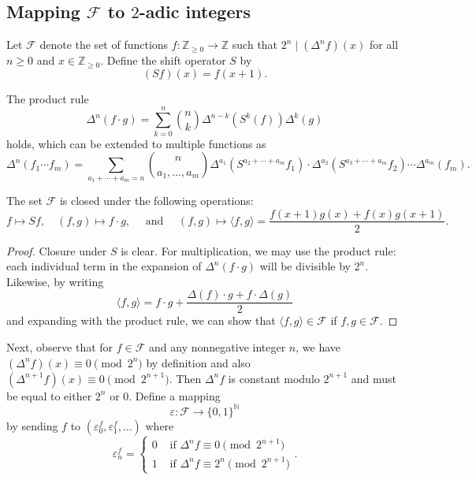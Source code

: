 \subsection{Mapping $\mathcal{F}$ to $2$-adic integers} \label{subsec:2-adics}

Let $\mathcal{F}$ denote the set of functions $f: \mathbb{Z}_{\geq 0}\to\mathbb{Z}$ such that $2^n\mid (\Delta^nf)(x)$ for all $n\geq 0$ and $x\in \mathbb{Z}_{\geq 0}$. Define the shift operator $S$ by
\[(Sf)(x)=f(x+1).\]

\begin{lemma}
\label{lem:productrule}
The product rule
\[\Delta^n(f\cdot g)=\sum_{k=0}^{n}\binom{n}{k}\Delta^{n-k}\left(S^k(f)\right)\Delta^k(g)\]
holds, which can be extended to multiple functions as
\[\Delta^n(f_1\dotsm f_m)=\sum_{a_1+\dotsb+a_m=n}\binom{n}{a_1, \dotsc, a_m}\Delta^{a_1}(S^{a_2+\dotsb+a_m}f_1)\cdot \Delta^{a_2}(S^{a_3+\dotsb+a_m}f_2)\dotsm \Delta^{a_m}(f_m).\]
\end{lemma}

\begin{lemma}
\label{lem:F closure}
The set $\mathcal{F}$ is closed under the following operations:
\[f\mapsto Sf, \quad (f, g)\mapsto f\cdot g, \quad \text{ and }\quad (f, g)\mapsto \langle f, g\rangle = \frac{f(x+1)g(x)+f(x)g(x+1)}{2}.\]
\end{lemma}
\begin{proof}
    Closure under $S$ is clear. For multiplication, we may use the product rule: each individual term in the expansion of $\Delta^n(f\cdot g)$ will be divisible by $2^n$. Likewise, by writing
    \[\langle f, g\rangle = f\cdot g + \frac{\Delta(f)\cdot g+f\cdot \Delta(g)}{2}\]
    and expanding with the product rule, we can show that $\langle f, g\rangle\in\mathcal{F}$ if $f, g\in\mathcal{F}$.
\end{proof}

Next, observe that for $f\in \mathcal{F}$ and any nonnegative integer $n$, we have $(\Delta^nf)(x)\equiv 0\pmod{2^n}$ by definition and also $(\Delta^{n+1}f)(x)\equiv 0\pmod{2^{n+1}}$. Then $\Delta^nf$ is constant modulo $2^{n+1}$ and must be equal to either $2^{n}$ or $0$. Define a mapping
\[\varepsilon: \mathcal{F}\to\{0, 1\}^{\mathbb{N}}\]
by sending $f$ to $(\varepsilon_0^f, \varepsilon_1^f, \dotsc)$ where 
\[
\varepsilon_n^f=\begin{cases}
0 & \text{ if }\Delta^nf\equiv 0\pmod {2^{n+1}} \\
1 & \text{ if }\Delta^nf\equiv 2^n\pmod{2^{n+1}}
\end{cases}.
\]

